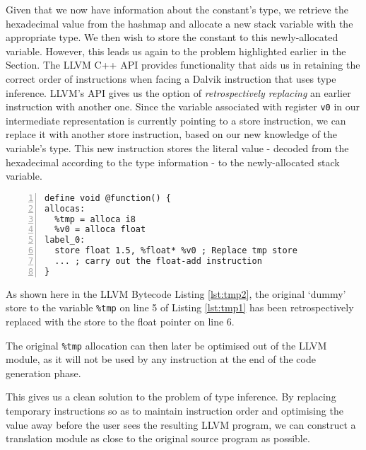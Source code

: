 Given that we now have information about the constant's type, we retrieve the hexadecimal value from the hashmap and allocate a new stack variable with the appropriate type. We then wish to store the constant to this newly-allocated variable. However, this leads us again to the problem highlighted earlier in the Section. The LLVM C++ API provides functionality that aids us in retaining the correct order of instructions when facing a Dalvik instruction that uses type inference. LLVM's API gives us the option of \textit{retrospectively replacing} an earlier instruction with another one. Since the variable associated with register \verb|v0| in our intermediate representation is currently pointing to a store instruction, we can replace it with another store instruction, based on our new knowledge of the variable's type. This new instruction stores the literal value - decoded from the hexadecimal according to the type information - to the newly-allocated stack variable.

\newpage

\begin{lstlisting}[frame=single, numbers=left, numberstyle=\tiny, caption={LLVM bytecode handling type inference (cont.)}, label=lst:tmp2]
define void @function() {
allocas:
  %tmp = alloca i8
  %v0 = alloca float
label_0:
  store float 1.5, %float* %v0 ; Replace tmp store
  ... ; carry out the float-add instruction
}
\end{lstlisting}

As shown here in the LLVM Bytecode Listing \ref{lst:tmp2}, the original `dummy' store to the variable \verb|%tmp| on line 5 of Listing \ref{lst:tmp1} has been retrospectively replaced with the store to the float pointer on line 6.

The original \verb|%tmp| allocation can then later be optimised out of the LLVM module, as it will not be used by any instruction at the end of the code generation phase.

This gives us a clean solution to the problem of type inference. By replacing temporary instructions so as to maintain instruction order and optimising the value away before the user sees the resulting LLVM program, we can construct a translation module as close to the original source program as possible.
